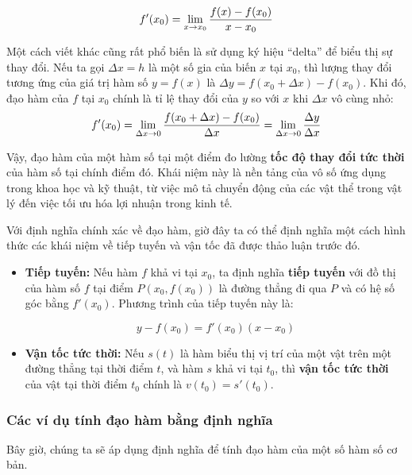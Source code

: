 \begin{importantbox}
    \[f'(x_0) = \lim\limits_{x \to x_0} \dfrac{f(x) - f(x_0)}{x - x_0}\]
\end{importantbox}


Một cách viết khác cũng rất phổ biến là sử dụng ký hiệu ``delta'' để biểu thị sự thay đổi. Nếu ta gọi $\Delta x = h$ là một số gia của biến $x$ tại $x_0$, thì lượng thay đổi tương ứng của giá trị hàm số $y=f(x)$ là $\Delta y = f(x_0 + \Delta x) - f(x_0)$. Khi đó, đạo hàm của $f$ tại $x_0$ chính là tỉ lệ thay đổi của $y$ so với $x$ khi $\Delta x$ vô cùng nhỏ:
$$
f'(x_0) = \lim\limits_{\Delta x \to 0} \dfrac{f(x_0 + \Delta x) - f(x_0)}{\Delta x} = \lim\limits_{\Delta x \to 0} \dfrac{\Delta y}{\Delta x}
$$

Vậy, đạo hàm của một hàm số tại một điểm đo lường \textbf{tốc độ thay đổi tức thời} của hàm số tại chính điểm đó. Khái niệm này là nền tảng của vô số ứng dụng trong khoa học và kỹ thuật, từ việc mô tả chuyển động của các vật thể trong vật lý đến việc tối ưu hóa lợi nhuận trong kinh tế.

Với định nghĩa chính xác về đạo hàm, giờ đây ta có thể định nghĩa một cách hình thức các khái niệm về tiếp tuyến và vận tốc đã được thảo luận trước đó.

\begin{itemize}
    \item \textbf{Tiếp tuyến:} Nếu hàm $f$ khả vi tại $x_0$, ta định nghĩa \textbf{tiếp tuyến} với đồ thị của hàm số $f$ tại điểm $P(x_0, f(x_0))$ là đường thẳng đi qua $P$ và có hệ số góc bằng $f'(x_0)$. Phương trình của tiếp tuyến này là:
    \begin{importantbox}
        \[y - f(x_0) = f'(x_0)(x - x_0)\]
    \end{importantbox}
    
    \item \textbf{Vận tốc tức thời:} Nếu $s(t)$ là hàm biểu thị vị trí của một vật trên một đường thẳng tại thời điểm $t$, và hàm $s$ khả vi tại $t_0$, thì \textbf{vận tốc tức thời} của vật tại thời điểm $t_0$ chính là $v(t_0) = s'(t_0)$.
\end{itemize}

\subsubsection{Các ví dụ tính đạo hàm bằng định nghĩa}

Bây giờ, chúng ta sẽ áp dụng định nghĩa để tính đạo hàm của một số hàm số cơ bản.

